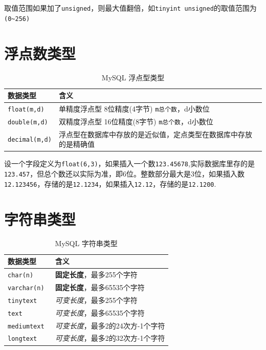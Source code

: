 \documentclass[UTF8,a4paper,12pt]{ctexbook}
\begin{document}
		取值范围如果加了\verb|unsigned|，则最大值翻倍，如\verb|tinyint unsigned|的取值范围为\verb|(0~256)|
		
		
	\section{浮点数类型}
		\begin{table}[H]
			\centering
			\caption{MySQL 浮点型类型}
			\begin{tabular}{p{2.5cm}<{\centering}|p{13.5cm}<{\centering}}
				\toprule
					数据类型  &  含义\\
				\midrule
					\verb|float(m,d) |  & 单精度浮点型    8位精度(4字节)      \verb|m总个数|，d小数位\\
					\verb|double(m,d) | & 双精度浮点型    16位精度(8字节)     \verb|m总个数|，d小数位\\
					\verb|decimal(m,d)| & 浮点型在数据库中存放的是近似值，定点类型在数据库中存放的是精确值\\
				\bottomrule
			\end{tabular}
		\end{table}	
		
		设一个字段定义为\verb|float(6,3)|，如果插入一个数\verb|123.45678|,实际数据库里存的是\verb|123.457|，但总个数还以实际为准，即6位。整数部分最大是3位，如果插入数\verb|12.123456|，存储的是\verb|12.1234|，如果插入\verb|12.12|，存储的是\verb|12.1200|.
			
	\section{字符串类型}
		\begin{table}[H]
			\centering
			\caption{MySQL 字符串类型}
			\begin{tabular}{p{5cm}<{\centering}|p{11cm}<{\centering}}
				\toprule
					数据类型  &  含义\\
				\midrule
					\verb|char(n) | & \textbf{固定长度}，最多255个字符 \\
					\verb|varchar(n) | & \textbf{固定长度}，最多65535个字符 \\
					\verb|tinytext | & \textit{可变长度}，最多255个字符\\
					\verb|text | & \textit{可变长度}，最多65535个字符\\
					\verb|mediumtext | & \textit{可变长度}，最多2的24次方-1个字符\\
					\verb|longtext | & \textit{可变长度}，最多2的32次方-1个字符\\
				\bottomrule
			\end{tabular}
		\end{table}	
		
\end{document}
